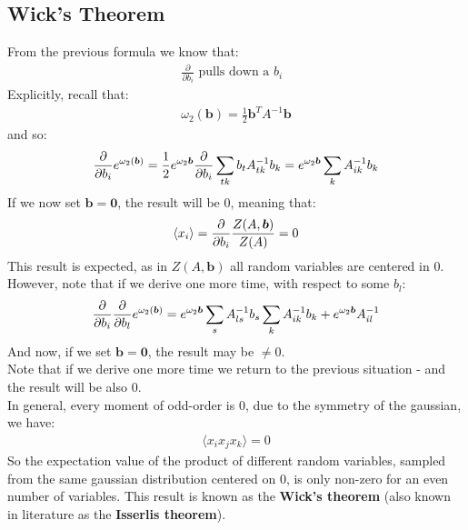 \documentclass[../template.tex]{subfiles}
\begin{document}
\subsection{Wick's Theorem}
From the previous formula we know that:
\begin{align*}
    \frac{\partial}{\partial b_i} \text{ pulls down a $b_i$ } 
\end{align*}
Explicitly, recall that:
\begin{align*}
    \omega_2 (\bm{b}) = \frac{1}{2} \bm{b}^T A^{-1} \bm{b}
\end{align*}
and so:
\begin{align*}
    \pdv{b_i} e^{\omega_2(\bm{b})} = \frac{1}{2} e^{\omega_2{\bm{b}}} \pdv{b_i} \sum_{tk}b_t A^{-1}_{tk} b_k = e^{\omega_2 \bm{b}} \sum_k A_{ik}^{-1} b_k
\end{align*}
If we now set $\bm{b} = \bm{0}$, the result will be $0$, meaning that:
\begin{align*}
    \langle x_i \rangle = \pdv{b_i} \frac{Z(A,\bm{b})}{Z(A)} = 0 
\end{align*}  
This result is expected, as in $Z(A, \bm{b})$ all random variables are centered in $0$.\\
However, note that if we derive one more time, with respect to some $b_l$:
\begin{align*}
    \pdv{b_i} \pdv{b_l} e^{\omega_2(\bm{b})} = e^{\omega_2 \bm{b}} \sum_s A_{ls}^{-1} b_s \sum_k A_{ik}^{-1} b_k + e^{\omega_2 \bm{b}} A_{il}^{-1} 
\end{align*}   
And now, if we set $\bm{b} = \bm{0}$, the result may be $\neq 0$.\\
Note that if we derive one more time we return to the previous situation - and the result will be also $0$.\\    

In general, every moment of odd-order is $0$, due to the symmetry of the gaussian, we have:
\begin{align*}
    \langle x_i x_j x_k \rangle = 0
\end{align*}
So the expectation value of the product of different random variables, sampled from the same gaussian distribution centered on $0$, is only non-zero for an even number of variables. This result is known as the \textbf{Wick's theorem} (also known in literature as the \textbf{Isserlis theorem}).\\
\end{document}
